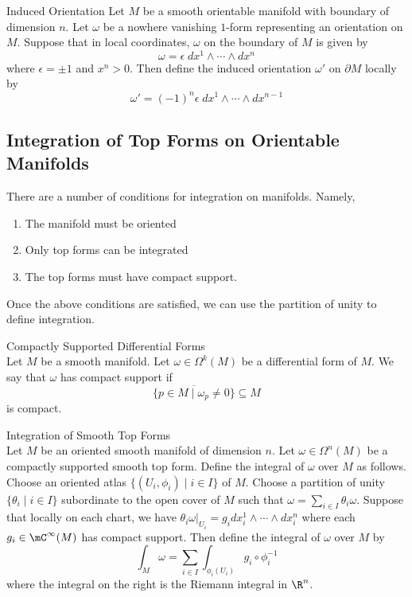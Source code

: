 \documentclass[a4paper]{article}
\begin{document}
\begin{defn}{Induced Orientation}{} Let $M$ be a smooth orientable manifold with boundary of dimension $n$. Let $\omega$ be a nowhere vanishing $1$-form representing an orientation on $M$. Suppose that in local coordinates, $\omega$ on the boundary of $M$ is given by $$\omega=\epsilon\;dx^1\wedge\cdots\wedge dx^n$$ where $\epsilon=\pm1$ and $x^n>0$. Then define the induced orientation $\omega'$ on $\partial M$ locally by $$\omega'=(-1)^n\epsilon\;dx^1\wedge\cdots\wedge dx^{n-1}$$
\end{defn}

\subsection{Integration of Top Forms on Orientable Manifolds}
There are a number of conditions for integration on manifolds. Namely, 
\begin{enumerate}
\item The manifold must be oriented
\item Only top forms can be integrated
\item The top forms must have compact support. 
\end{enumerate}

Once the above conditions are satisfied, we can use the partition of unity to define integration.  

\begin{defn}{Compactly Supported Differential Forms}{}\\
Let $M$ be a smooth manifold. Let $\omega\in\Omega^k(M)$ be a differential form of $M$. We say that $\omega$ has compact support if $$\overline{\{p\in M\;|\;\omega_p\neq 0\}}\subseteq M$$ is compact. 
\end{defn}

\begin{defn}{Integration of Smooth Top Forms}{}\\
Let $M$ be an oriented smooth manifold of dimension $n$. Let $\omega\in\Omega^n(M)$ be a compactly supported smooth top form. Define the integral of $\omega$ over $M$ as follows. Choose an oriented atlas $\{(U_i,\phi_i)\;|\;i\in I\}$ of $M$. Choose a partition of unity $\{\theta_i\;|\;i\in I\}$ subordinate to the open cover of $M$ such that $\omega=\sum_{i\in I}\theta_i\omega$. Suppose that locally on each chart, we have $\theta_i\omega|_{U_i}=g_i dx_i^1\wedge\cdots\wedge dx_i^n$ where each $g_i\in\mC^\infty(M)$ has compact support. Then define the integral of $\omega$ over $M$ by $$\int_M\omega=\sum_{i\in I}\int_{\phi_i(U_i)}g_i\circ\phi_i^{-1}$$ where the integral on the right is the Riemann integral in $\R^n$. 
\end{defn}
\end{document}
